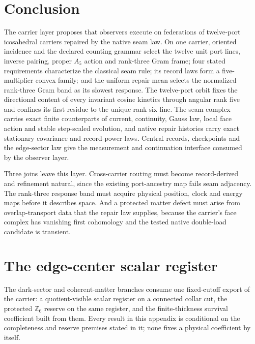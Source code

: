 \documentclass[11pt]{article}
\theoremstyle{remark}
\theoremstyle{plain}
\begin{document}


\section{Conclusion}

The carrier layer proposes that observers execute on federations of
twelve-port icosahedral carriers repaired by the native seam law. On one
carrier, oriented incidence and the declared counting grammar select the
twelve unit port lines, inverse pairing, proper \(A_5\) action and rank-three
Gram frame; four stated requirements characterize the classical seam rule;
its record laws form a five-multiplier convex family; and the uniform repair
mean selects the normalized rank-three Gram band as its slowest response.
The twelve-port orbit fixes the directional content of every invariant cosine
kinetics through angular rank five and confines its first residue to the
unique rank-six line. The seam complex carries exact finite counterparts of
current, continuity, Gauss law, local face action and stable step-scaled
evolution, and native repair histories carry exact stationary covariance and
record-power laws. Central records, checkpoints and the edge-sector law give
the measurement and continuation interface consumed by the observer layer.

Three joins leave this layer. Cross-carrier routing must become
record-derived and refinement natural, since the existing port-ancestry map
fails seam adjacency. The rank-three response band must acquire physical
position, clock and energy maps before it describes space. And a protected
matter defect must arise from overlap-transport data that the repair law
supplies, because the carrier's face complex has vanishing first cohomology
and the tested native double-load candidate is transient.

\appendix

\section{The edge-center scalar register}
\label{app:edge-center-scalar-register}

The dark-sector and coherent-matter branches consume one fixed-cutoff export
of the carrier: a quotient-visible scalar register on a connected collar
cut, the protected \(\mathbb Z_6\) reserve on the same register, and the
finite-thickness survival coefficient built from them. Every result in this
appendix is conditional on the completeness and reserve premises stated in
it; none fixes a physical coefficient by itself.
\end{document}
